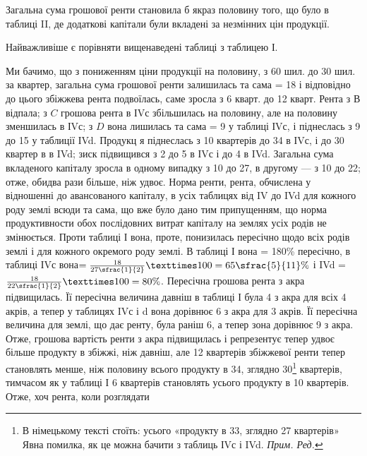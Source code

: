 
Загальна сума грошової ренти становила б якраз половину того, що було
в таблиці II, де додаткові капітали були вкладені за незмінних цін продукції.

Найважливіше є порівняти вищенаведені таблиці з таблицею І.

Ми бачимо, що з пониженням ціни продукції на половину, з 60 шил. до
30 шил. за квартер, загальна сума грошової ренти залишилась та сама = 18 і відповідно до цього збіжжева рента подвоїлась, саме зросла з 6 кварт. до
12 кварт. Рента з $В$ відпала; з $C$ грошова рента в ІVс збільшилась на половину,
але на половину зменшилась в ІVс; з $D$ вона лишилась та сама = 9 у таблиці ІVс, і піднеслась з 9 до 15 у таблиції ІVd.
Продукц я піднеслась з 10 квартерів до 34 в ІVс, і до 30 квартер в в IVd;
зиск підвищився з 2 до 5 в ІVс і до 4 в IVd. Загальна сума
вкладеного капіталу зросла в одному випадку з 10 до 27,
в другому — з 10 до 22; отже, обидва рази більше, ніж удвоє. Норма
ренти, рента, обчислена у відношенні до авансованого капіталу, в усіх таблицях
від IV до IVd для кожного роду землі всюди та сама, що вже було дано тим припущенням,
що норма продуктивности обох послідовних витрат капіталу на землях
усіх родів не змінюється. Проти таблиці І вона, проте, понизилась пересічно
щодо всіх родів землі і для кожного окремого роду землі. В таблиці І вона =
180\% пересічно, в таблиці ІVс вона$ = \frac{18}{27\sfrac{1}{2}} × 100 = 65\sfrac{5}{11}\%$ і
IVd = $\frac{18}{22\sfrac{1}{2}} × 100 = 80\%$. Пересічна грошова рента з акра підвищилась. Її пересічна
величина давніш в таблиці І була 4 з акра для всіх 4 акрів,
а тепер у таблицях IVс і d вона дорівнює 6 з акра для 3 акрів.
Її пересічна величина для землі, що дає ренту, була раніш 6, а тепер
зона дорівнює 9 з акра. Отже, грошова вартість ренти з акра підвищилась
і репрезентує тепер удвоє більше продукту в збіжжі, ніж давніш, але
12 квартерів збіжжевої ренти тепер становлять менше, ніж половину всього продукту
в 34, зглядно 30\footnote*{В німецькому тексті стоїть: усього «продукту в 33, зглядно 27 квартерів» Явна помилка,
як це можна бачити з таблиць ІVс і IVd. \emph{Прим. Ред.}} квартерів, тимчасом як у таблиці І 6 квартерів становлять
  усього продукту в 10 квартерів. Отже, хоч рента, коли розглядати
